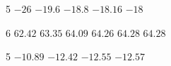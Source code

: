 \documentclass{book}
\begin{document}
\begin{appendices}
\begin{enumerate}[!HW!]
\begin{multicols}{5}
\itemspade $-26$
\itemspade $-19.6$
\itemspade $-18.8$
\itemspade $-18.16$
\itemspade $-18$
\end{multicols}

\begin{multicols}{6}
\itemspade $62.42$
\itemspade $63.35$
\itemspade $64.09$
\itemspade $64.26$
\itemspade $64.28$
\itemspade $64.28$
\end{multicols}

\begin{multicols}{5}
\itemspade  $-10.89$
\itemspade  $-12.42$
\itemspade $-12.55$
\itemspade  $-12.57$
\end{multicols}
\end{enumerate}
\vspace{-15 pt}


\end{appendices}
\end{document}
